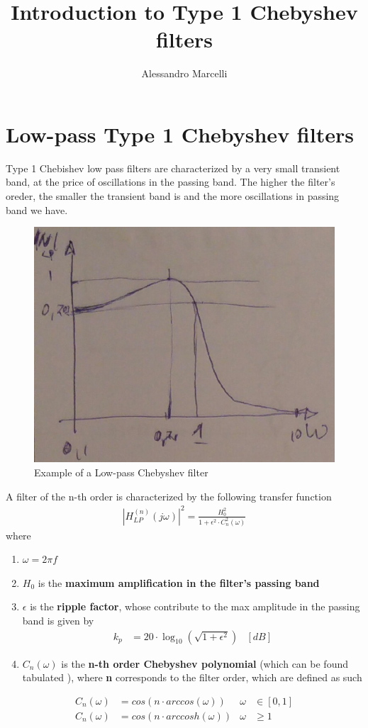 \documentclass[a4paper,12pt]{report}
\title{Introduction to Type 1 Chebyshev filters}
\author{Alessandro Marcelli}
\begin{document}
\maketitle

\tableofcontents

\newpage

\section{Low-pass Type 1 Chebyshev filters}

Type 1 Chebishev low pass filters are characterized by a very small transient band, at the price of oscillations in the passing band. The higher the filter's oreder, the smaller the transient band is and the more oscillations in passing band we have.  

\begin{figure}[!htb]
	\centering
	\includegraphics[width=.3\textwidth]{pictures/escheb.png}
	\caption{\label{lul} \small Example of a Low-pass Chebyshev filter}
\end{figure}


A filter of the n-th order is characterized by the following transfer function
\begin{align}
|H_{LP}^{(n)}(j\omega)|^2 = \frac{H_0^2}{1 + \epsilon^2\cdot C_n^2(\omega)}
\end{align}
where
\begin{enumerate}
\item $\omega = 2\pi f$
\item $H_0$ is the \textbf{maximum amplification in the filter's passing band}
\item $\epsilon$ is the \textbf{ripple factor}, whose contribute to the max amplitude in the passing band is given by 
\begin{align}
	k_p &= 20 \cdot \log_{10}(\sqrt{1 +\epsilon^2}) &[dB]
\end{align}

\item $C_n(\omega)$ is the \textbf{n-th order Chebyshev polynomial} (which can be found tabulated \cite{cheby}), where \textbf{n} corresponds to the filter order, which are defined as such 
\end{enumerate}
\begin{align}
	C_n(\omega) &= cos(n \cdot arccos(\omega))  &\omega &\in [0,1]\\
	C_n(\omega) &= cos(n \cdot arccosh(\omega)) &\omega &\geq 1
\end{align}  
\end{document}
